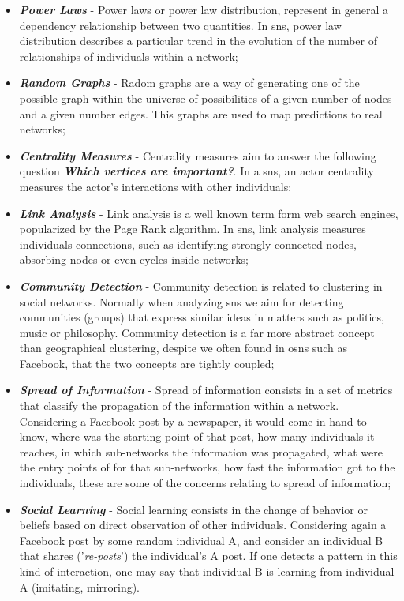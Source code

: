 \begin{itemize}
\item \textbf{\textit{Power Laws}} - Power laws or power law distribution, represent in general a dependency relationship between two quantities. In \glspl{sn}, power law distribution describes a particular trend in the evolution of the number of relationships of individuals within a network;
\item \textbf{\textit{Random Graphs}} - Radom graphs are a way of generating one of the possible graph within the universe of possibilities of a given number of nodes and a given number edges. This graphs are used to map predictions to real networks;
\item \textbf{\textit{Centrality Measures}} - Centrality measures aim to answer the following question \textit{\textbf{Which vertices are important?}}. In a \glspl{sn}, an actor centrality measures the actor's interactions with other individuals;
\item \textbf{\textit{Link Analysis}} - Link analysis is a well known term form web search engines, popularized by the Page Rank algorithm. In \glspl{sn}, link analysis measures individuals connections, such as identifying strongly connected nodes, absorbing nodes or even cycles inside networks;
\item \textbf{\textit{Community Detection}} - Community detection is related to clustering in social networks. Normally when analyzing \glspl{sn} we aim for detecting communities (groups) that express similar ideas in matters such as politics, music or philosophy. Community detection is a far more abstract concept than geographical clustering, despite we often found in \glspl{osn} such as Facebook, that the two concepts are tightly coupled;
\item \textbf{\textit{Spread of Information}} - Spread of information consists in a set of metrics that classify the propagation of the information within a network. Considering a Facebook post by a newspaper, it would come in hand to know, where was the starting point of that post, how many individuals it reaches, in which sub-networks the information was propagated, what were the entry points of for that sub-networks, how fast the information got to the individuals, these are some of the concerns relating to spread of information;
\item \textbf{\textit{Social Learning}} - Social learning consists in the change of behavior or beliefs based on direct observation of other individuals. Considering again a Facebook post by some random individual A, and consider an individual B that shares ('\textit{re-posts}') the individual's A post. If one detects a pattern in this kind of interaction, one may say that individual B is learning from individual A (imitating, mirroring).
\end{itemize}


